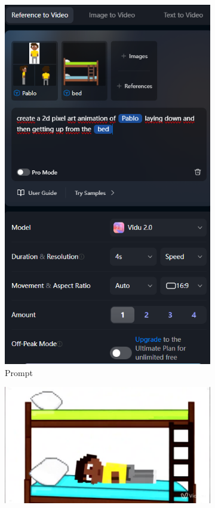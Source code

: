 \begin{figure}[htbp]
    \centering
    \caption{\small Processo da utilização 4 do Vidu em agosto/2025}
    \label{fig:vidu9}
    \begin{subfigure}{0.35\linewidth}
        \includegraphics[width=1\linewidth]{figs/vidu/tela9.PNG}
        \caption{\small Prompt}
        \label{fig:vidu9a}
    \end{subfigure}
    \begin{subfigure}{0.55\linewidth}
        \includegraphics[width=1\linewidth]{figs/vidu/frame9.jpg}

\end{subfigure}
\end{figure}
